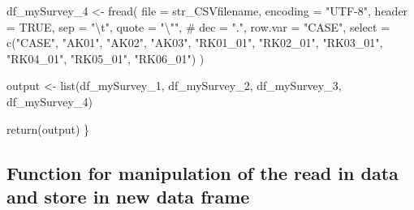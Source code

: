 \documentclass[
]{article}
\newenvironment{Shaded}{\begin{snugshade}}{\end{snugshade}}
\newcommand{\AttributeTok}[1]{\textcolor[rgb]{0.00,0.34,0.68}{#1}}
\newcommand{\CommentTok}[1]{\textcolor[rgb]{0.54,0.53,0.53}{#1}}
\newcommand{\ConstantTok}[1]{\textcolor[rgb]{0.67,0.33,0.00}{#1}}
\newcommand{\FunctionTok}[1]{\textcolor[rgb]{0.39,0.29,0.61}{#1}}
\newcommand{\NormalTok}[1]{\textcolor[rgb]{0.12,0.11,0.11}{#1}}
\newcommand{\OtherTok}[1]{\textcolor[rgb]{0.00,0.43,0.16}{#1}}
\newcommand{\SpecialCharTok}[1]{\textcolor[rgb]{0.24,0.68,0.91}{#1}}
\newcommand{\StringTok}[1]{\textcolor[rgb]{0.75,0.01,0.01}{#1}}
\begin{document}
\begin{Shaded}
\begin{Highlighting}[]
\NormalTok{  df\_mySurvey\_4 }\OtherTok{\textless{}{-}} \FunctionTok{fread}\NormalTok{(}
    \AttributeTok{file =}\NormalTok{ str\_CSVfilename, }\AttributeTok{encoding =} \StringTok{"UTF{-}8"}\NormalTok{,}
    \AttributeTok{header =} \ConstantTok{TRUE}\NormalTok{, }\AttributeTok{sep =} \StringTok{"}\SpecialCharTok{\textbackslash{}t}\StringTok{"}\NormalTok{, }\AttributeTok{quote =} \StringTok{"}\SpecialCharTok{\textbackslash{}"}\StringTok{"}\NormalTok{,}
    \CommentTok{\# dec = ".", row.var = "CASE",}
    \AttributeTok{select =} \FunctionTok{c}\NormalTok{(}\StringTok{"CASE"}\NormalTok{, }\StringTok{"AK01"}\NormalTok{, }\StringTok{"AK02"}\NormalTok{, }\StringTok{"AK03"}\NormalTok{, }
               \StringTok{"RK01\_01"}\NormalTok{, }\StringTok{"RK02\_01"}\NormalTok{, }\StringTok{"RK03\_01"}\NormalTok{, }\StringTok{"RK04\_01"}\NormalTok{, }\StringTok{"RK05\_01"}\NormalTok{, }\StringTok{"RK06\_01"}\NormalTok{)}
\NormalTok{    )}
  
\NormalTok{  output }\OtherTok{\textless{}{-}} \FunctionTok{list}\NormalTok{(df\_mySurvey\_1, df\_mySurvey\_2, df\_mySurvey\_3, df\_mySurvey\_4)}
  
  \FunctionTok{return}\NormalTok{(output)}
\NormalTok{\}}
\end{Highlighting}
\end{Shaded}

\hypertarget{function-for-manipulation-of-the-read-in-data-and-store-in-new-data-frame}{%
\subsection{Function for manipulation of the read in data and store in
new data
frame}\label{function-for-manipulation-of-the-read-in-data-and-store-in-new-data-frame}}
\end{document}
